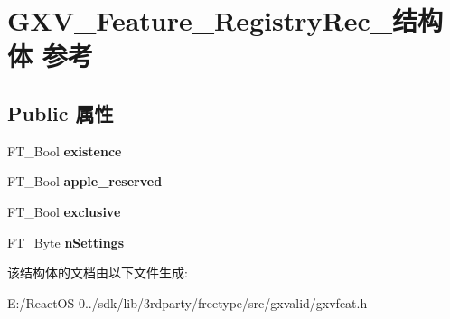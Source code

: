 \hypertarget{struct_g_x_v___feature___registry_rec__}{}\section{G\+X\+V\+\_\+\+Feature\+\_\+\+Registry\+Rec\+\_\+结构体 参考}
\label{struct_g_x_v___feature___registry_rec__}
\subsection*{Public 属性}
\begin{DoxyCompactItemize}
\item 
\mbox{\label{struct_g_x_v___feature___registry_rec___ad6229ea84325c8e3bada72b66ed5ef2a}} 
F\+T\+\_\+\+Bool {\bfseries existence}
\item 
\mbox{\label{struct_g_x_v___feature___registry_rec___a4984d5dff0d739890c2a0e91d0faf0ca}} 
F\+T\+\_\+\+Bool {\bfseries apple\+\_\+reserved}
\item 
\mbox{\label{struct_g_x_v___feature___registry_rec___a5eb5fc0abfc632a5a0d3920d62e45f41}} 
F\+T\+\_\+\+Bool {\bfseries exclusive}
\item 
\mbox{\label{struct_g_x_v___feature___registry_rec___a541d0cd9328653df04dc3566f8acece8}} 
F\+T\+\_\+\+Byte {\bfseries n\+Settings}
\end{DoxyCompactItemize}


该结构体的文档由以下文件生成\+:\begin{DoxyCompactItemize}
\item 
E\+:/\+React\+O\+S-\/0../sdk/lib/3rdparty/freetype/src/gxvalid/gxvfeat.\+h\end{DoxyCompactItemize}
